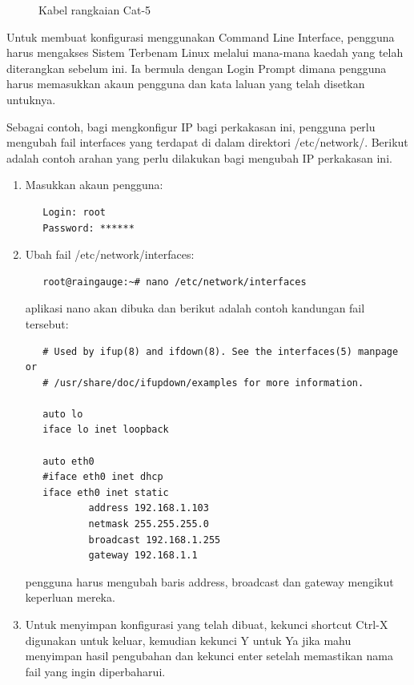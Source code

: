 \begin{figure}[!h]
\caption[Kabel rangkaian Cat-5]{Kabel rangkaian Cat-5}
\label{c2:f3}
\end{figure}

Untuk membuat konfigurasi menggunakan Command Line Interface, pengguna harus mengakses Sistem Terbenam Linux melalui mana-mana kaedah yang telah diterangkan sebelum ini. Ia bermula dengan Login Prompt dimana pengguna harus memasukkan akaun pengguna dan kata laluan yang telah disetkan untuknya.

Sebagai contoh, bagi mengkonfigur IP bagi perkakasan ini, pengguna perlu mengubah fail interfaces yang terdapat di dalam direktori /etc/network/. Berikut adalah contoh arahan yang perlu dilakukan bagi mengubah IP perkakasan ini.
\begin{enumerate}
\item Masukkan akaun pengguna:
{\footnotesize\renewcommand{\baselinestretch}{1.0}
\begin{verbatim}
   Login: root
   Password: ******

\end{verbatim}}

\item Ubah fail /etc/network/interfaces:
{\footnotesize\renewcommand{\baselinestretch}{1.0}
\begin{verbatim}
   root@raingauge:~# nano /etc/network/interfaces
\end{verbatim}}
   aplikasi nano akan dibuka dan berikut adalah contoh kandungan fail tersebut:
{\footnotesize\renewcommand{\baselinestretch}{1.0}
\begin{verbatim}   
   # Used by ifup(8) and ifdown(8). See the interfaces(5) manpage or 
   # /usr/share/doc/ifupdown/examples for more information.
   
   auto lo
   iface lo inet loopback
   
   auto eth0
   #iface eth0 inet dhcp
   iface eth0 inet static
           address 192.168.1.103
           netmask 255.255.255.0
           broadcast 192.168.1.255
           gateway 192.168.1.1
\end{verbatim}}

pengguna harus mengubah baris address, broadcast dan gateway mengikut keperluan mereka.
   
\item Untuk menyimpan konfigurasi yang telah dibuat, kekunci shortcut Ctrl-X digunakan untuk keluar, kemudian kekunci Y untuk Ya jika mahu menyimpan hasil pengubahan dan kekunci enter setelah memastikan nama fail yang ingin diperbaharui.
\end{enumerate}

